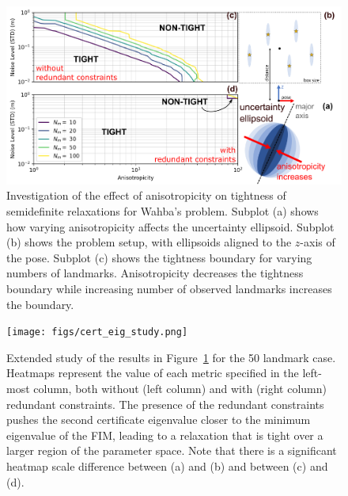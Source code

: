 \documentclass[lettersize,journal]{IEEEtran}
\begin{document}
\begin{figure}[!t]
	\centering
	\includegraphics[width=\columnwidth]{figs/elliposoid_align_fig.png}
	\caption{Investigation of the effect of anisotropicity on tightness of semidefinite relaxations for Wahba's problem.  Subplot (a) shows how varying anisotropicity affects the uncertainty ellipsoid. Subplot (b) shows the problem setup, with ellipsoids aligned to the $z$-axis of the pose. Subplot (c) shows the tightness boundary for varying numbers of landmarks. Anisotropicity decreases the tightness boundary while increasing number of observed landmarks increases the boundary.}
	\label{fig:ellipsoid_align}
\end{figure}


\begin{figure}[!t]
	\centering
	\texttt{[image: figs/cert\_eig\_study.png]}
	\caption{Extended study of the results in Figure~\ref{fig:ellipsoid_align} for the 50 landmark case. Heatmaps represent the value of each metric specified in the left-most column, both without (left column) and with (right column) redundant constraints. The presence of the redundant constraints pushes the second certificate eigenvalue closer to the minimum eigenvalue of the FIM, leading to a relaxation that is tight over a larger region of the parameter space. Note that there is a significant heatmap scale difference between (a) and (b) and between (c) and (d). }
	\label{fig:cert_eig_study}
\end{figure}
\end{document}
